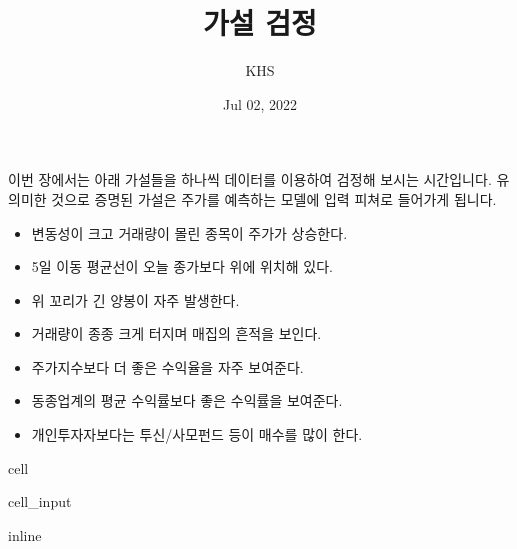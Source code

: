 \documentclass[letterpaper,10pt,english]{jupyterBook}
\title{가설 검정}
\date{Jul 02, 2022}
\author{KHS}
\begin{document}
\pagestyle{empty}
\sphinxmaketitle
\pagestyle{plain}
\sphinxtableofcontents
\pagestyle{normal}
\label{\detokenize{chapter5/5.1.0_Hypothesis::doc}}


\sphinxAtStartPar
이번 장에서는 아래 가설들을 하나씩 데이터를 이용하여 검정해 보시는 시간입니다. 유의미한 것으로 증명된 가설은 주가를 예측하는 모델에 입력 피쳐로 들어가게 됩니다.
\begin{itemize}
\item {} 
\sphinxAtStartPar
변동성이 크고 거래량이 몰린 종목이 주가가 상승한다.

\item {} 
\sphinxAtStartPar
5일 이동 평균선이 오늘 종가보다 위에 위치해 있다.

\item {} 
\sphinxAtStartPar
위 꼬리가 긴 양봉이 자주 발생한다.

\item {} 
\sphinxAtStartPar
거래량이 종종 크게 터지며 매집의 흔적을 보인다.

\item {} 
\sphinxAtStartPar
주가지수보다 더 좋은 수익율을 자주 보여준다.

\item {} 
\sphinxAtStartPar
동종업계의 평균 수익률보다 좋은 수익률을 보여준다.

\item {} 
\sphinxAtStartPar
개인투자자보다는 투신/사모펀드 등이 매수를 많이 한다.

\end{itemize}

\begin{sphinxuseclass}{cell}\begin{sphinxVerbatimInput}

\begin{sphinxuseclass}{cell_input}
\begin{sphinxVerbatim}[commandchars=\\\{\}]
   
 inline
   
   
   
  
\end{sphinxVerbatim}

\end{sphinxuseclass}\end{sphinxVerbatimInput}

\end{sphinxuseclass}
\end{document}

